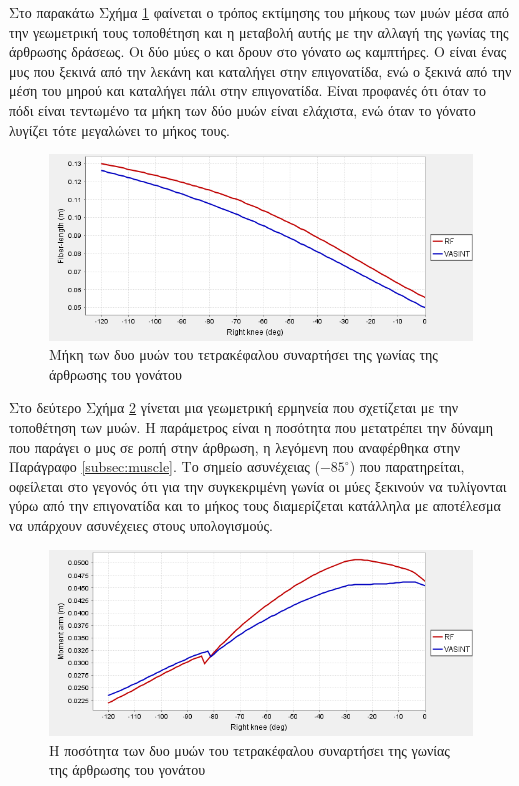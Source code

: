 Στο παρακάτω Σχήμα \ref{fig:iber-length-vs-knee-angle} φαίνεται ο τρόπος εκτίμησης του μήκους των μυών μέσα από την γεωμετρική τους τοποθέτηση και η μεταβολή αυτής με την αλλαγή της γωνίας της άρθρωσης δράσεως. Οι δύο μύες ο  και  δρουν στο γόνατο ως καμπτήρες. Ο  είναι ένας μυς που ξεκινά από την λεκάνη και καταλήγει στην επιγονατίδα, ενώ  ο  ξεκινά από την μέση του μηρού και καταλήγει πάλι στην επιγονατίδα. Είναι προφανές ότι όταν το πόδι είναι τεντωμένο τα μήκη των δύο μυών είναι ελάχιστα, ενώ όταν το γόνατο λυγίζει τότε μεγαλώνει το μήκος τους.

\begin{figure}[H]
    \centering
    \includegraphics[width=0.8\linewidth, keepaspectratio]{fig/fiber-length-vs-knee-angle.png}
    \caption{Μήκη των δυο μυών του τετρακέφαλου συναρτήσει της γωνίας της άρθρωσης του γονάτου}
    \label{fig:iber-length-vs-knee-angle}
\end{figure}

Στο δεύτερο Σχήμα \ref{fig:moment-arm-vs-knee-angle} γίνεται μια γεωμετρική ερμηνεία που σχετίζεται με την τοποθέτηση των μυών. Η παράμετρος είναι η ποσότητα που μετατρέπει την δύναμη που παράγει ο μυς σε ροπή στην άρθρωση, η λεγόμενη  που αναφέρθηκα στην Παράγραφο \ref{subsec:muscle}. Το σημείο ασυνέχειας ($-85^{\circ}$) που παρατηρείται, οφείλεται στο γεγονός ότι για την συγκεκριμένη γωνία οι μύες ξεκινούν να τυλίγονται γύρω από την επιγονατίδα και το μήκος τους διαμερίζεται κατάλληλα με αποτέλεσμα να υπάρχουν ασυνέχειες στους υπολογισμούς.

\begin{figure}[H]
    \centering
    \includegraphics[width=0.8\linewidth, keepaspectratio]{fig/moment-arm-vs-knee-angle.png}
    \caption{Η ποσότητα  των δυο μυών του τετρακέφαλου συναρτήσει της γωνίας της άρθρωσης του γονάτου}
    \label{fig:moment-arm-vs-knee-angle}
\end{figure}

